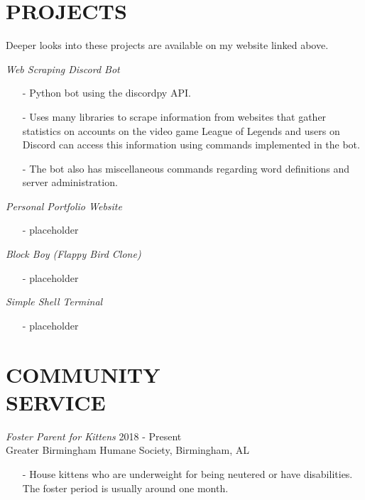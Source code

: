 \documentclass[margin, 10pt]{res} %
\begin{document}
\begin{resume}
\section{PROJECTS}

Deeper looks into these projects are available on my website linked above.

{\sl Web Scraping Discord Bot}
\begin{itemize} \itemsep -2pt %
\item[-] Python bot using the discordpy API.
\item[-] Uses many libraries to scrape information from websites that gather statistics on accounts on the video game League of Legends and users on Discord can access this information using commands implemented in the bot.
\item[-] The bot also has miscellaneous commands regarding word definitions and server administration.
\end{itemize}

{\sl Personal Portfolio Website}
\begin{itemize} \itemsep -2pt %
\item[-] placeholder
\end{itemize}

{\sl Block Boy (Flappy Bird Clone)}
\begin{itemize} \itemsep -2pt %
\item[-] placeholder
\end{itemize}

{\sl Simple Shell Terminal}
\begin{itemize} \itemsep -2pt %
\item[-] placeholder
\end{itemize}

\section{COMMUNITY \\ SERVICE}

{\sl Foster Parent for Kittens} \hfill 2018 - Present \\
Greater Birmingham Humane Society, Birmingham, AL
\begin{itemize} 
\item[-] House kittens who are underweight for being neutered or have disabilities. The foster period is usually around one month.
\end{itemize}



\end{resume}
\end{document}
